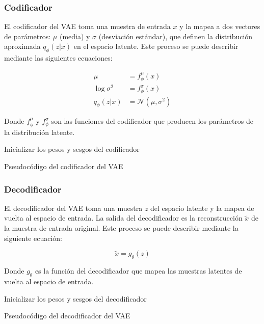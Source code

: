 \subsubsection{Codificador}

El codificador del VAE toma una muestra de entrada $x$ y la mapea a dos vectores de parámetros: $\mu$ (media) y $\sigma$ (desviación estándar), que definen la distribución aproximada $q_{\phi}(z|x)$ en el espacio latente. Este proceso se puede describir mediante las siguientes ecuaciones:

\begin{align}
    \mu &= f_{\phi}^{\mu}(x) \\
    \log \sigma^2 &= f_{\phi}^{\sigma}(x) \\
    q_{\phi}(z|x) &= \mathcal{N}(\mu, \sigma^2)
\end{align}

Donde $f_{\phi}^{\mu}$ y $f_{\phi}^{\sigma}$ son las funciones del codificador que producen los parámetros de la distribución latente.

\begin{algorithm}[H]
\SetAlgoLined
Inicializar los pesos y sesgos del codificador \\
\caption{Pseudocódigo del codificador del VAE}
\end{algorithm}

\subsubsection{Decodificador}

El decodificador del VAE toma una muestra $z$ del espacio latente y la mapea de vuelta al espacio de entrada. La salida del decodificador es la reconstrucción $\tilde{x}$ de la muestra de entrada original. Este proceso se puede describir mediante la siguiente ecuación:

\begin{equation}
    \tilde{x} = g_{\theta}(z)
\end{equation}

Donde $g_{\theta}$ es la función del decodificador que mapea las muestras latentes de vuelta al espacio de entrada.

\begin{algorithm}[H]
\SetAlgoLined
Inicializar los pesos y sesgos del decodificador \\
\caption{Pseudocódigo del decodificador del VAE}
\end{algorithm}

